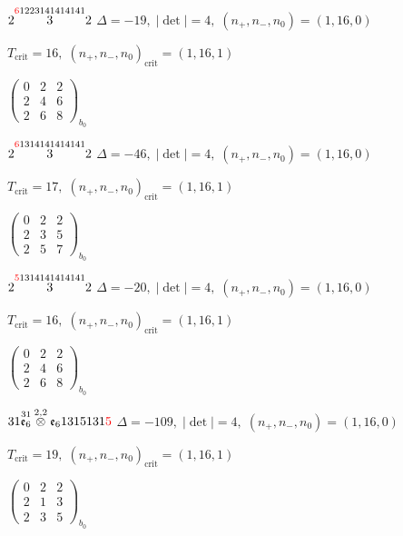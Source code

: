 \documentclass[10pt]{article}
\begin{document}
$2\overset{\textcolor{red}{6}1223141414141}{3}2$ \quad $\Delta=-19,\; |\det|=4,\; (n_+,n_-,n_0)=(1,16,0)$

\hspace{1em}$T_{\text{crit}}=16,\; (n_+,n_-,n_0)_{\text{crit}}=(1,16,1)$

\hspace{2em}$\left(\begin{smallmatrix}0 & 2 & 2 \\ 2 & 4 & 6 \\ 2 & 6 & 8\end{smallmatrix}\right)_{\!b_0}$

\smallskip

$2\overset{\textcolor{red}{6}1314141414141}{3}2$ \quad $\Delta=-46,\; |\det|=4,\; (n_+,n_-,n_0)=(1,16,0)$

\hspace{1em}$T_{\text{crit}}=17,\; (n_+,n_-,n_0)_{\text{crit}}=(1,16,1)$

\hspace{2em}$\left(\begin{smallmatrix}0 & 2 & 2 \\ 2 & 3 & 5 \\ 2 & 5 & 7\end{smallmatrix}\right)_{\!b_0}$

$2\overset{\textcolor{red}{5}1314141414141}{3}2$ \quad $\Delta=-20,\; |\det|=4,\; (n_+,n_-,n_0)=(1,16,0)$

\hspace{1em}$T_{\text{crit}}=16,\; (n_+,n_-,n_0)_{\text{crit}}=(1,16,1)$

\hspace{2em}$\left(\begin{smallmatrix}0 & 2 & 2 \\ 2 & 4 & 6 \\ 2 & 6 & 8\end{smallmatrix}\right)_{\!b_0}$

\smallskip

$31\overset{31}{\mathfrak{e}_6}\overset{2,2}{\otimes}\mathfrak{e}_61315131\textcolor{red}{5}$ \quad $\Delta=-109,\; |\det|=4,\; (n_+,n_-,n_0)=(1,16,0)$

\hspace{1em}$T_{\text{crit}}=19,\; (n_+,n_-,n_0)_{\text{crit}}=(1,16,1)$

\hspace{2em}$\left(\begin{smallmatrix}0 & 2 & 2 \\ 2 & 1 & 3 \\ 2 & 3 & 5\end{smallmatrix}\right)_{\!b_0}$
\end{document}
